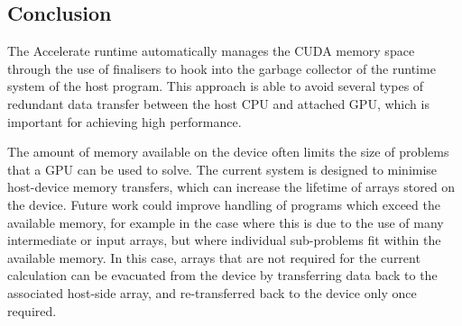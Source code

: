 \subsection{Conclusion}
\label{sec:memory_management_conclusion}

The Accelerate runtime automatically manages the CUDA memory space through the
use of finalisers to hook into the garbage collector of the runtime system of
the host program. This approach is able to avoid several types of redundant data
transfer between the host CPU and attached GPU, which is important for
achieving high performance.

The amount of memory available on the device often limits the size of problems
that a GPU can be used to solve. The current system is designed to minimise
host-device memory transfers, which can increase the lifetime of arrays stored
on the device. Future work could improve handling of programs which exceed the
available memory, for example in the case where this is due to the use of many
intermediate or input arrays, but where individual sub-problems fit within the
available memory. In this case, arrays that are not required for the current
calculation can be evacuated from the device by transferring data back to the
associated host-side array, and re-transferred back to the device only once
required.

